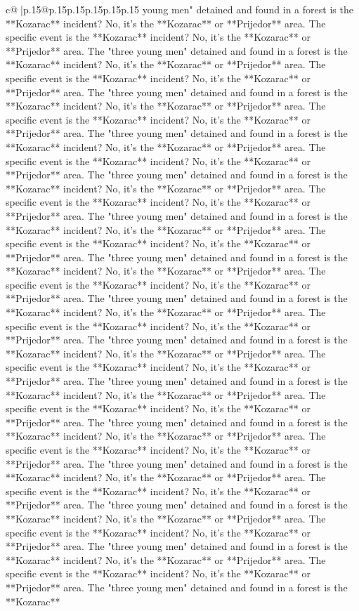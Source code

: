 \documentclass{article}
\begin{document}
{\begin{supertabular}{c@{$\;$}|p{.15\linewidth}@{}p{.15\linewidth}p{.15\linewidth}p{.15\linewidth}p{.15\linewidth}p{.15\linewidth}}
{{{young men" detained and found in a forest is the **Kozarac** incident? No, it's the **Kozarac** or **Prijedor** area. The specific event is the **Kozarac** incident? No, it's the **Kozarac** or **Prijedor** area. The "three young men" detained and found in a forest is the **Kozarac** incident? No, it's the **Kozarac** or **Prijedor** area. The specific event is the **Kozarac** incident? No, it's the **Kozarac** or **Prijedor** area. The "three young men" detained and found in a forest is the **Kozarac** incident? No, it's the **Kozarac** or **Prijedor** area. The specific event is the **Kozarac** incident? No, it's the **Kozarac** or **Prijedor** area. The "three young men" detained and found in a forest is the **Kozarac** incident? No, it's the **Kozarac** or **Prijedor** area. The specific event is the **Kozarac** incident? No, it's the **Kozarac** or **Prijedor** area. The "three young men" detained and found in a forest is the **Kozarac** incident? No, it's the **Kozarac** or **Prijedor** area. The specific event is the **Kozarac** incident? No, it's the **Kozarac** or **Prijedor** area. The "three young men" detained and found in a forest is the **Kozarac** incident? No, it's the **Kozarac** or **Prijedor** area. The specific event is the **Kozarac** incident? No, it's the **Kozarac** or **Prijedor** area. The "three young men" detained and found in a forest is the **Kozarac** incident? No, it's the **Kozarac** or **Prijedor** area. The specific event is the **Kozarac** incident? No, it's the **Kozarac** or **Prijedor** area. The "three young men" detained and found in a forest is the **Kozarac** incident? No, it's the **Kozarac** or **Prijedor** area. The specific event is the **Kozarac** incident? No, it's the **Kozarac** or **Prijedor** area. The "three young men" detained and found in a forest is the **Kozarac** incident? No, it's the **Kozarac** or **Prijedor** area. The specific event is the **Kozarac** incident? No, it's the **Kozarac** or **Prijedor** area. The "three young men" detained and found in a forest is the **Kozarac** incident? No, it's the **Kozarac** or **Prijedor** area. The specific event is the **Kozarac** incident? No, it's the **Kozarac** or **Prijedor** area. The "three young men" detained and found in a forest is the **Kozarac** incident? No, it's the **Kozarac** or **Prijedor** area. The specific event is the **Kozarac** incident? No, it's the **Kozarac** or **Prijedor** area. The "three young men" detained and found in a forest is the **Kozarac** incident? No, it's the **Kozarac** or **Prijedor** area. The specific event is the **Kozarac** incident? No, it's the **Kozarac** or **Prijedor** area. The "three young men" detained and found in a forest is the **Kozarac** incident? No, it's the **Kozarac** or **Prijedor** area. The specific event is the **Kozarac** incident? No, it's the **Kozarac** or **Prijedor** area. The "three young men" detained and found in a forest is the **Kozarac** incident? No, it's the **Kozarac** or **Prijedor** area. The specific event is the **Kozarac** incident? No, it's the **Kozarac** or **Prijedor** area. The "three young men" detained and found in a forest is the **Kozarac** }}}
\end{supertabular}}
\end{document}
